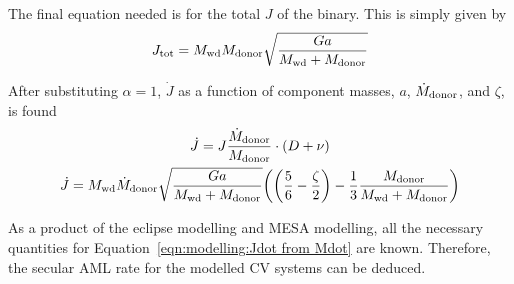 The final equation needed is for the total $J$ of the binary. This is simply given by
\begin{equation}
    J_{\rm tot} = M_{\rm wd} M_{\rm donor} \sqrt{\frac{G a }{M_{\rm wd} + M_{\rm donor}}}
\end{equation}

After substituting $\alpha = 1$, $\dot J$ as a function of component masses, $a$, $\dot M_{\rm donor}$, and $\zeta$, is found
\begin{gather}
    \dot J = J \frac{\dot M_{\rm donor}}{M_{\rm donor}} \cdot (D + \nu) \\
    \dot J = M_{\rm wd} \dot M_{\rm donor} \sqrt{\frac{G a }{M_{\rm wd} + M_{\rm donor}}} \bigg( \bigg(\frac{5}{6} - \frac{\zeta}{2}\bigg )  - \frac{1}{3} \frac{M_{\rm donor}}{M_{\rm wd} + M_{\rm donor}}\bigg ) \label{eqn:modelling:Jdot from Mdot}
\end{gather}

As a product of the eclipse modelling and MESA modelling, all the necessary quantities for Equation~\ref{eqn:modelling:Jdot from Mdot} are known. Therefore, the secular AML rate for the modelled CV systems can be deduced.